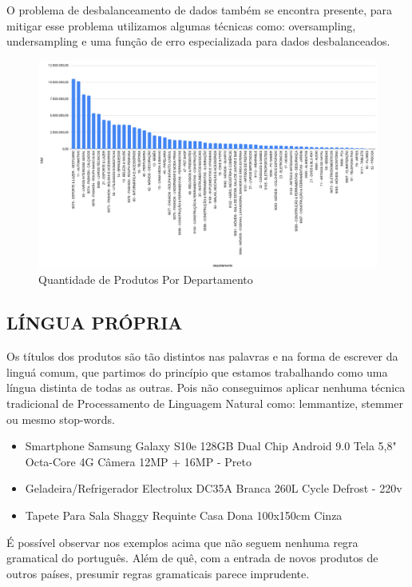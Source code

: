 O problema de desbalanceamento de dados também se encontra presente, para mitigar esse problema utilizamos algumas técnicas como: oversampling, undersampling e  uma função de erro especializada para dados desbalanceados.

\begin{figure}[htb]
	\caption{\label{char_bar_produtos_por_categoria} Quantidade de Produtos Por Departamento}
	\begin{center}
	    \includegraphics[width=\textwidth]{artigo/recursos/imagens/Quantidade de Produtos por Departamento.png}
	\end{center}
\end{figure}

\subsection{LÍNGUA PRÓPRIA}

Os títulos dos produtos são tão distintos nas palavras e na forma de escrever da linguá comum, que partimos do princípio que estamos trabalhando como uma língua distinta de todas as outras. Pois não conseguimos aplicar nenhuma técnica tradicional de Processamento de Linguagem Natural como: lemmantize, stemmer ou mesmo stop-words.

\begin{itemize}
\item Smartphone Samsung Galaxy S10e 128GB Dual Chip Android 9.0 Tela 5,8" Octa-Core 4G Câmera 12MP + 16MP - Preto
\item Geladeira/Refrigerador Electrolux DC35A Branca 260L Cycle Defrost - 220v
\item Tapete Para Sala Shaggy Requinte Casa Dona 100x150cm Cinza
\end{itemize}

É possível observar nos exemplos acima que não seguem nenhuma regra gramatical do português. Além de quê, com a entrada de novos produtos de outros países, presumir regras gramaticais parece imprudente.